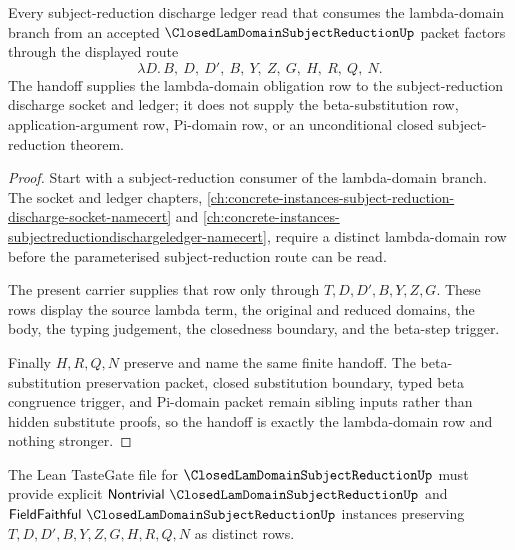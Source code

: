 \begin{theorem}
\label{thm:closed-lam-domain-subject-reduction-handoff}
Every subject-reduction discharge ledger read that consumes the lambda-domain branch from an accepted $\ClosedLamDomainSubjectReductionUp$ packet factors through the displayed route
$$
\lambda D.\,B,\ D,\ D',\ B,\ Y,\ Z,\ G,\ H,\ R,\ Q,\ N .
$$
The handoff supplies the lambda-domain obligation row to the subject-reduction discharge socket and ledger; it does not supply the beta-substitution row, application-argument row, Pi-domain row, or an unconditional closed subject-reduction theorem.
\end{theorem}
\begin{proof}
Start with a subject-reduction consumer of the lambda-domain branch. The socket and ledger chapters, \autoref{ch:concrete-instances-subject-reduction-discharge-socket-namecert} and \autoref{ch:concrete-instances-subjectreductiondischargeledger-namecert}, require a distinct lambda-domain row before the parameterised subject-reduction route can be read.

The present carrier supplies that row only through $T,D,D',B,Y,Z,G$. These rows display the source lambda term, the original and reduced domains, the body, the typing judgement, the closedness boundary, and the beta-step trigger.

Finally $H,R,Q,N$ preserve and name the same finite handoff. The beta-substitution preservation packet, closed substitution boundary, typed beta congruence trigger, and Pi-domain packet remain sibling inputs rather than hidden substitute proofs, so the handoff is exactly the lambda-domain row and nothing stronger.
\end{proof}



The Lean TasteGate file for $\ClosedLamDomainSubjectReductionUp$ must provide explicit $\mathsf{Nontrivial}\ \ClosedLamDomainSubjectReductionUp$ and $\mathsf{FieldFaithful}\ \ClosedLamDomainSubjectReductionUp$ instances preserving $T,D,D',B,Y,Z,G,H,R,Q,N$ as distinct rows.

